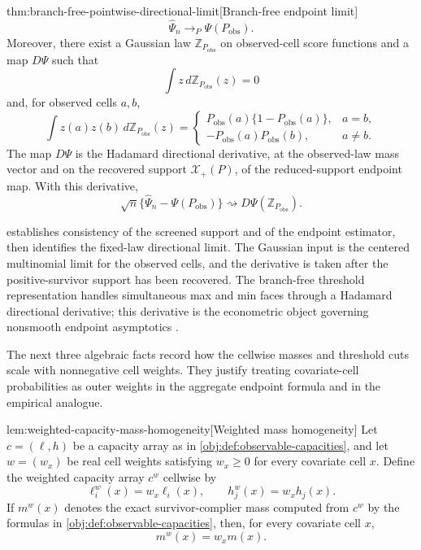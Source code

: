 \documentclass[11pt]{article}
\begin{document}
\begin{theoremv}{thm:branch-free-pointwise-directional-limit}[Branch-free endpoint limit]
\[
\widehat\Psi_n\to_P\Psi(P_{\mathrm{obs}}).
\]
Moreover, there exist a Gaussian law \(\mathbb Z_{P_{\mathrm{obs}}}\) on observed-cell score functions and a map \(D\Psi\) such that
\[
\int z\,d\mathbb Z_{P_{\mathrm{obs}}}(z)=0
\]
and, for observed cells \(a,b\),
\[
\int z(a)z(b)\,d\mathbb Z_{P_{\mathrm{obs}}}(z)
=
\begin{cases}
P_{\mathrm{obs}}(a)\{1-P_{\mathrm{obs}}(a)\}, & a=b,\\
-P_{\mathrm{obs}}(a)P_{\mathrm{obs}}(b), & a\ne b.
\end{cases}
\]
The map \(D\Psi\) is the Hadamard directional derivative, at the observed-law mass vector and on the recovered support \(\mathcal X_+(P)\), of the reduced-support endpoint map.  With this derivative,
\[
\sqrt n\{\widehat\Psi_n-\Psi(P_{\mathrm{obs}})\}
\rightsquigarrow
D\Psi(\mathbb Z_{P_{\mathrm{obs}}}).
\]
\end{theoremv}

 establishes consistency of the screened support and of the endpoint estimator, then identifies the fixed-law directional limit.  The Gaussian input  is the centered multinomial limit for the observed cells, and the derivative is taken after the positive-survivor support  has been recovered.  The branch-free threshold representation handles simultaneous max and min faces through a Hadamard directional derivative; this derivative is the econometric object governing nonsmooth endpoint asymptotics \citep{FangSantos2019,HongLi2018}.

The next three algebraic facts record how the cellwise masses and threshold cuts scale with nonnegative cell weights.  They justify treating covariate-cell probabilities as outer weights in the aggregate endpoint formula and in the empirical analogue.

\begin{lemmav}{lem:weighted-capacity-mass-homogeneity}[Weighted mass homogeneity]
Let \(c=(\ell,h)\) be a capacity array as in \cref{obj:def:observable-capacities}, and let \(w=(w_x)\) be real cell weights satisfying \(w_x\ge 0\) for every covariate cell \(x\).  Define the weighted capacity array \(c^w\) cellwise by
\[
\ell_i^w(x)=w_x\ell_i(x),
\qquad
h_j^w(x)=w_xh_j(x).
\]
If \(m^w(x)\) denotes the exact survivor-complier mass computed from \(c^w\) by the formulas in \cref{obj:def:observable-capacities}, then, for every covariate cell \(x\),
\[
m^w(x)=w_x m(x).
\]
\end{lemmav}
\end{document}
